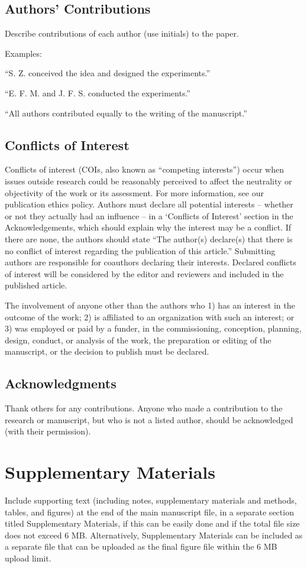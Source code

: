 \documentclass{article}
\begin{document}
\subsection*{Authors' Contributions} 
Describe contributions of each author (use initials) to the paper. 

\medskip Examples:

``S. Z. conceived the idea and designed the experiments.''

``E. F. M. and J. F. S. conducted the experiments.''

``All authors contributed equally to the writing of the manuscript.''

\subsection*{Conflicts of Interest}
Conflicts of interest (COIs, also known as ``competing interests'') occur when issues outside research could be reasonably perceived to affect the neutrality or objectivity of the work or its assessment. For more information, see our publication ethics policy. Authors must declare all potential interests – whether or not they actually had an influence – in a ‘Conflicts of Interest’ section in the Acknowledgements, which should explain why the interest may be a conflict. If there are none, the authors should state ``The author(s) declare(s) that there is no conflict of interest regarding the publication of this article.'' Submitting authors are responsible for coauthors declaring their interests. Declared conflicts of interest will be considered by the editor and reviewers and included in the published article.

The involvement of anyone other than the authors who 1) has an interest in the outcome of the work; 2) is affiliated to an organization with such an interest; or 3) was employed or paid by a funder, in the commissioning, conception, planning, design, conduct, or analysis of the work, the preparation or editing of the manuscript, or the decision to publish must be declared.

\subsection*{Acknowledgments}
Thank others for any contributions. Anyone who made a contribution to the research or manuscript, but who is not a listed author, should be acknowledged (with their permission).

\section*{Supplementary Materials}
Include supporting text (including notes, supplementary materials and methods, tables, and figures) at the end of the main manuscript file, in a separate section titled Supplementary Materials, if this can be easily done and if the total file size does not exceed 6 MB. Alternatively, Supplementary Materials can be included as a separate file that can be uploaded as the final figure file within the 6 MB upload limit. 
\end{document}
